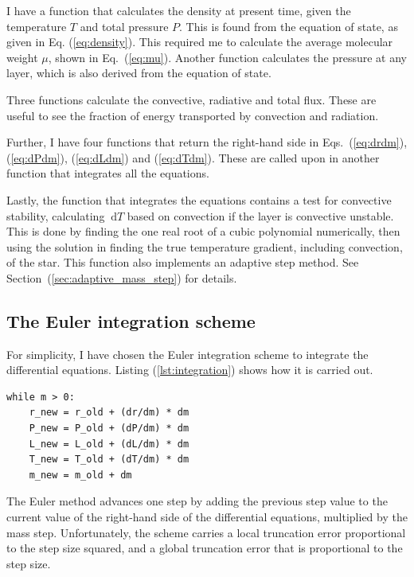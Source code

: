 \documentclass[a4paper, 11pt, english]{article}
\newcommand{\dd}[1]{\ \mathrm{d}#1} %
\newcommand{\refeq}[1]{(\textcolor{red}{\ref{eq:#1}})} %
\newcommand{\reflst}[1]{(\textcolor{red}{\ref{lst:#1}})}
\begin{document}
I have a function that calculates the density at present time, given the temperature
$T$ and total pressure $P$. This is found from the equation of state, as given in Eq.
\refeq{density}. This required me to calculate the average molecular weight $\mu$,
shown in Eq.~\refeq{mu}. Another function calculates the pressure at any layer, which is
also derived from the equation of state.

Three functions calculate the convective, radiative and total flux. These are useful to
see the fraction of energy transported by convection and radiation.

Further, I have four functions that return the right-hand side in Eqs.~\refeq{drdm},
\refeq{dPdm}, \refeq{dLdm} and \refeq{dTdm}. These are called upon in another function
that integrates all the equations.

Lastly, the function that integrates the equations contains a test for convective
stability, calculating $\dd{T}$ based on convection if the layer is convective unstable.
This is done by finding the one real root of a cubic polynomial numerically, then using
the solution in finding the true temperature gradient, including convection, of the star.
This function also implements an adaptive step method. See
Section~(\ref{sec:adaptive_mass_step}) for details.


\subsection{The Euler integration scheme}

For simplicity, I have chosen the Euler integration scheme to integrate the differential
equations. Listing \reflst{integration} shows how it is carried out.
\belowcaptionskip=-10pt
\begin{lstlisting}[label=lst:integration,caption=Euler integration loop]	
while m > 0:
	r_new = r_old + (dr/dm) * dm
	P_new = P_old + (dP/dm) * dm
	L_new = L_old + (dL/dm) * dm
	T_new = T_old + (dT/dm) * dm
	m_new = m_old + dm
\end{lstlisting}
The Euler method advances one step by adding the previous step value to the current value
of the right-hand side of the differential equations, multiplied by the mass step.
Unfortunately, the scheme carries a local truncation error proportional to the step size
squared, and a global truncation error that is proportional to the step size.
\end{document}
